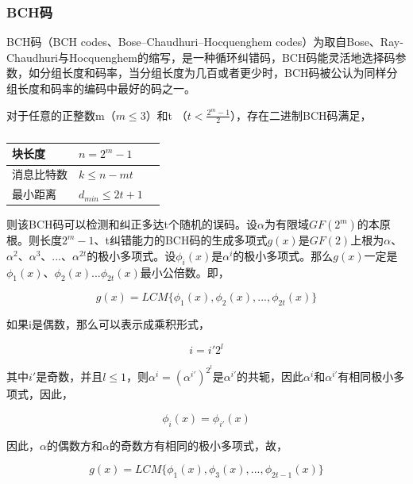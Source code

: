 \documentclass[master]{seuthesis} %
\begin{document}
\begin{Main}
\subsubsection{BCH码}

BCH码（BCH codes、Bose–Chaudhuri–Hocquenghem codes）为取自Bose、Ray-Chaudhuri与Hocquenghem的缩写，是一种循环纠错码，BCH码能灵活地选择码参数，如分组长度和码率，当分组长度为几百或者更少时，BCH码被公认为同样分组长度和码率的编码中最好的码之一。

对于任意的正整数m（$m \leq 3 $）和t （$ t < \frac{2^m - 1}{2} $），存在二进制BCH码满足，

\begin{table}[]
    \centering
    \begin{tabular}{|l|l|l|}
    \hline
    块长度 & $ n = 2^m - 1 $  \\ \hline
    消息比特数 & $ k \leq n - mt $  \\ \hline
    最小距离 & $ d_{min} \leq 2t + 1 $  \\ \hline
    \end{tabular}
    \caption{
    \label{}}
\end{table}

则该BCH码可以检测和纠正多达t个随机的误码。设$\alpha$为有限域$GF(2^m)$的本原根。则长度$2^m - 1$、t纠错能力的BCH码的生成多项式$g(x)$是$GF(2)$上根为$\alpha$、${\alpha}^2$、${\alpha}^3$、...、${\alpha}^{2t}$的极小多项式。设$\phi_i(x)$是$\alpha^i$的极小多项式。那么$g(x)$一定是$\phi_1(x)$、$\phi_2(x)$...$\phi_{2t}(x)$最小公倍数。即，

\begin{equation}
    g(x) = LCM\{\phi_1(x), \phi_2(x), ... , \phi_{2t}(x)\}
\end{equation}

如果i是偶数，那么可以表示成乘积形式，

\begin{equation}
    i = i'2^l
\end{equation}

其中$i'$是奇数，并且$l \leq 1$，则$\alpha^i = (\alpha^{i'})^{2^l}$是$\alpha^{i'}$的共轭，因此$\alpha^i$和$\alpha^{i'}$有相同极小多项式，因此，

\begin{equation}
    \phi_i(x) = \phi_{i'}(x)
\end{equation}

因此，$\alpha$的偶数方和$\alpha$的奇数方有相同的极小多项式，故，

\begin{equation}
    g(x) = LCM\{\phi_1(x), \phi_3(x), ... , \phi_{2t-1}(x)\}
\end{equation}


\end{Main}
\end{document}
